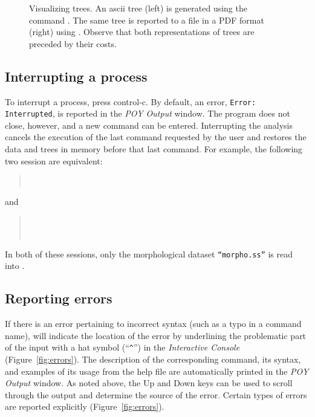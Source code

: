 {\begin{figure}
\begin{minipage}[c]{0.5\textwidth}
\end{minipage}
\caption{Visualizing trees. An ascii tree (left) is generated using the command
. The same tree is reported to a file in a PDF 
format (right) using . 
Observe that both representations of trees  are preceded by their costs.}
\label{fig:trees}
\end{figure}

\subsection{Interrupting a process}
To interrupt a process, press control-c. By default, an error,
\texttt{Error:}\\ \texttt{Interrupted}, is reported in the \emph{POY
Output} window. The program does not close, however, and a new
command can be entered. Interrupting the analysis cancels the
execution of the last command requested by the user and restores
the data and trees in memory before that last command. For example,
the following two session are equivalent:

\begin{quote}
 \\
\end{quote}
and

\begin{quote}
 \\
 \\
\end{quote}

In both of these sessions, only the morphological dataset \texttt{``morpho.ss''} 
is read into \poy.

\subsection{Reporting errors}
If there is an error pertaining to incorrect syntax (such as a typo in a command 
name), \poy will indicate the location of the error by underlining the problematic 
part of the input with a hat symbol (``\texttt{\^}'') in the \emph{Interactive Console} 
(Figure~\ref{fig:errors}). The description of the corresponding command, its syntax, 
and examples of its usage from the help file are automatically printed in the 
\emph{POY Output} window. As noted above, the Up and Down keys can be 
used to scroll through the output and determine the source of the error. Certain 
types of errors are reported explicitly (Figure~\ref{fig:errors}).

}
